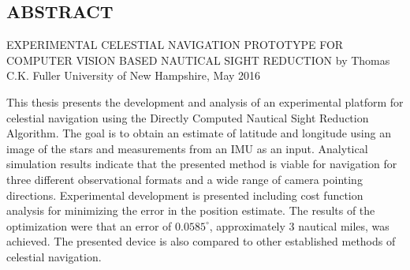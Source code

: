 \documentclass[12pt,a4paper]{book}
\begin{document}
\tableofcontents
\listoffigures
\listoftables
\newpage
\break
\begin{center}
\section*{ABSTRACT}

EXPERIMENTAL CELESTIAL NAVIGATION PROTOTYPE FOR COMPUTER VISION BASED NAUTICAL SIGHT REDUCTION\break
by\break
Thomas C.K. Fuller\break
University of New Hampshire, May 2016
\end{center}
This thesis presents the development and analysis of an experimental platform for celestial navigation using the Directly Computed Nautical Sight Reduction Algorithm.  The goal is to obtain an estimate of latitude and longitude using an image of the stars and measurements from an IMU as an input.  Analytical simulation results indicate that the presented method is viable for navigation for three different observational formats and a wide range of camera pointing directions.  Experimental development is presented including cost function analysis for minimizing the error in the position estimate.  The results of the optimization were that an error of $0.0585^{\circ}$, approximately 3 nautical miles, was achieved.  The presented device is also compared to other established methods of celestial navigation.
\end{document}
